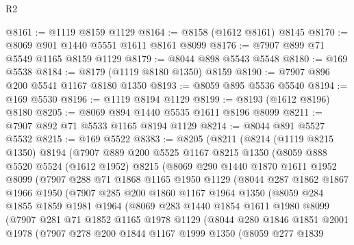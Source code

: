 \begin{lexlean}{R2}
\begin{coremodule}
@8161 := @1119 @8159 @1129
@8164 := @8158 (@1612 @8161) @8145
@8170 := @8069 @901 @1440 @5551 @1611 @8161 @8099
@8176 := @7907 @899 @71 @5549 @1165 @8159 @1129
@8179 := @8044 @898 @5543 @5548
@8180 := @169 @5538
@8184 := @8179 (@1119 @8180 @1350) @8159
@8190 := @7907 @896 @200 @5541 @1167 @8180 @1350
@8193 := @8059 @895 @5536 @5540
@8194 := @169 @5530
@8196 := @1119 @8194 @1129
@8199 := @8193 (@1612 @8196) @8180
@8205 := @8069 @894 @1440 @5535 @1611 @8196 @8099
@8211 := @7907 @892 @71 @5533 @1165 @8194 @1129
@8214 := @8044 @891 @5527 @5532
@8215 := @169 @5522
@8383 := @8205
    (@8211
      (@8214
        (@1119 @8215 @1350)
        @8194
        (@7907
          @889
          @200
          @5525
          @1167
          @8215
          @1350
          (@8059
            @888
            @5520
            @5524
            (@1612 @1952)
            @8215
            (@8069
              @290
              @1440
              @1870
              @1611
              @1952
              @8099
              (@7907
                @288
                @71
                @1868
                @1165
                @1950
                @1129
                (@8044
                  @287
                  @1862
                  @1867
                  @1966
                  @1950
                  (@7907
                    @285
                    @200
                    @1860
                    @1167
                    @1964
                    @1350
                    (@8059
                      @284
                      @1855
                      @1859
                      @1981
                      @1964
                      (@8069
                        @283
                        @1440
                        @1854
                        @1611
                        @1980
                        @8099
                        (@7907
                          @281
                          @71
                          @1852
                          @1165
                          @1978
                          @1129
                          (@8044
                            @280
                            @1846
                            @1851
                            @2001
                            @1978
                            (@7907
                              @278
                              @200
                              @1844
                              @1167
                              @1999
                              @1350
                              (@8059
                                @277
                                @1839

\end{coremodule}
\end{lexlean}
